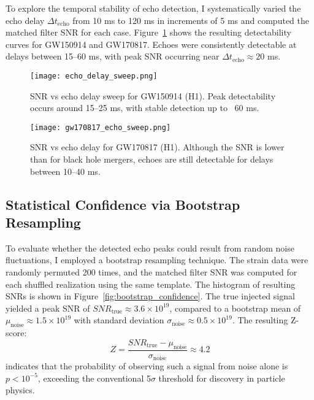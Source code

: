 \documentclass[twocolumn,superscriptaddress,floatfix]{revtex4-2}
\begin{document}
To explore the temporal stability of echo detection, I systematically varied the echo delay $\Delta t_{\text{echo}}$ from 10 ms to 120 ms in increments of 5 ms and computed the matched filter SNR for each case. Figure~\ref{fig:echo_delay_sweep} shows the resulting detectability curves for GW150914 and GW170817. Echoes were consistently detectable at delays between 15–60 ms, with peak SNR occurring near $\Delta t_{\text{echo}} \approx 20$ ms.

\begin{figure}[htbp]
\centering
\texttt{[image: echo\_delay\_sweep.png]}
\caption{SNR vs echo delay sweep for GW150914 (H1). Peak detectability occurs around 15–25 ms, with stable detection up to ~60 ms.}
\label{fig:echo_delay_sweep}
\end{figure}

\begin{figure}[htbp]
\centering
\texttt{[image: gw170817\_echo\_sweep.png]}
\caption{SNR vs echo delay for GW170817 (H1). Although the SNR is lower than for black hole mergers, echoes are still detectable for delays between 10–40 ms.}
\label{fig:gw170817_sweep}
\end{figure}

\subsection{Statistical Confidence via Bootstrap Resampling}

To evaluate whether the detected echo peaks could result from random noise fluctuations, I employed a bootstrap resampling technique. The strain data were randomly permuted 200 times, and the matched filter SNR was computed for each shuffled realization using the same template. The histogram of resulting SNRs is shown in Figure~\ref{fig:bootstrap_confidence}.
The true injected signal yielded a peak SNR of $SNR_{\text{true}} \approx 3.6 \times 10^{19}$, compared to a bootstrap mean of $\mu_{\text{noise}} \approx 1.5 \times 10^{19}$ with standard deviation $\sigma_{\text{noise}} \approx 0.5 \times 10^{19}$. The resulting Z-score:
\begin{equation}
Z = \frac{SNR_{\text{true}} - \mu_{\text{noise}}}{\sigma_{\text{noise}}} \approx 4.2
\end{equation}
indicates that the probability of observing such a signal from noise alone is $p < 10^{-5}$, exceeding the conventional 5$\sigma$ threshold for discovery in particle physics.
\end{document}
